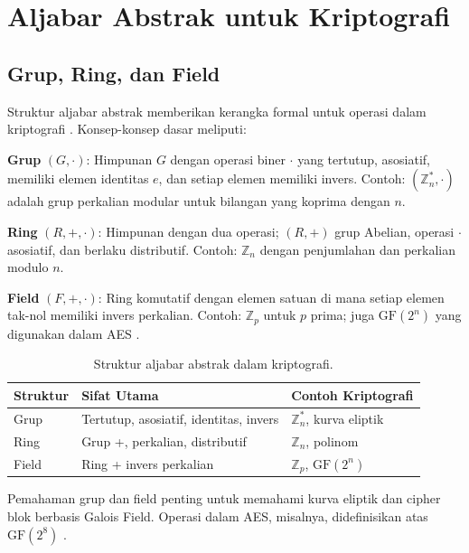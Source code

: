 \section{Aljabar Abstrak untuk Kriptografi}

\subsection{Grup, Ring, dan Field}

Struktur aljabar abstrak memberikan kerangka formal untuk operasi dalam kriptografi \cite{stallings2017}. Konsep-konsep dasar meliputi:

\textbf{Grup} $(G, \cdot)$: Himpunan $G$ dengan operasi biner $\cdot$ yang tertutup, asosiatif, memiliki elemen identitas $e$, dan setiap elemen memiliki invers. Contoh: $(\mathbb{Z}_n^*, \cdot)$ adalah grup perkalian modular untuk bilangan yang koprima dengan $n$.

\textbf{Ring} $(R, +, \cdot)$: Himpunan dengan dua operasi; $(R,+)$ grup Abelian, operasi $\cdot$ asosiatif, dan berlaku distributif. Contoh: $\mathbb{Z}_n$ dengan penjumlahan dan perkalian modulo $n$.

\textbf{Field} $(F, +, \cdot)$: Ring komutatif dengan elemen satuan di mana setiap elemen tak-nol memiliki invers perkalian. Contoh: $\mathbb{Z}_p$ untuk $p$ prima; juga $\mathrm{GF}(2^n)$ yang digunakan dalam AES \cite{menezes1996,fips197}.

\begin{table}[htbp]
  \centering
  \small
  \begin{tabular}{>{\raggedright\arraybackslash}p{2.5cm}>{\raggedright\arraybackslash}p{4.5cm}>{\raggedright\arraybackslash}p{4.5cm}}
    \toprule
    Struktur & Sifat Utama & Contoh Kriptografi \\
    \midrule
    Grup & Tertutup, asosiatif, identitas, invers & $\mathbb{Z}_n^*$, kurva eliptik \\
    Ring & Grup +, perkalian, distributif & $\mathbb{Z}_n$, polinom \\
    Field & Ring + invers perkalian & $\mathbb{Z}_p$, $\mathrm{GF}(2^n)$ \\
    \bottomrule
  \end{tabular}
  \caption{Struktur aljabar abstrak dalam kriptografi.}
\end{table}

Pemahaman grup dan field penting untuk memahami kurva eliptik dan cipher blok berbasis Galois Field. Operasi dalam AES, misalnya, didefinisikan atas $\mathrm{GF}(2^8)$ \cite{fips197}.

